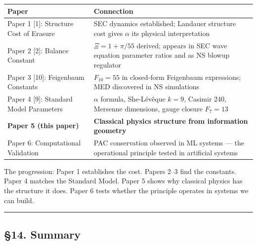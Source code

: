 \documentclass[
  11pt,
  a4paper]{article}
\begin{document}
\begin{longtable}[]{@{}
  >{\raggedright\arraybackslash}p{}
  >{\raggedright\arraybackslash}p{}@{}}
\toprule\noalign{}
\begin{minipage}[b]{\linewidth}\raggedright
Paper
\end{minipage} & \begin{minipage}[b]{\linewidth}\raggedright
Connection
\end{minipage} \\
\midrule\noalign{}
\endhead
\bottomrule\noalign{}
\endlastfoot
Paper 1 {[}1{]}: Structure Cost of Erasure & SEC dynamics established;
Landauer structure cost gives \(\alpha\) its physical interpretation \\
Paper 2 {[}2{]}: Balance Constant & \(\Xi = 1 + \pi/55\) derived;
appears in SEC wave equation parameter ratios and as NS blowup
regulator \\
Paper 3 {[}10{]}: Feigenbaum Constants & \(F_{10} = 55\) in closed-form
Feigenbaum expressions; MED discovered in NS simulations \\
Paper 4 {[}9{]}: Standard Model Parameters & \(\alpha\) formula,
She-Lévêque \(k = 9\), Casimir 240, Mersenne dimensions, gauge closure
\(F_7 = 13\) \\
\textbf{Paper 5 (this paper)} & \textbf{Classical physics structure from
information geometry} \\
Paper 6: Computational Validation & PAC conservation observed in ML
systems --- the operational principle tested in artificial systems \\
\end{longtable}

The progression: Paper 1 establishes the cost. Papers 2--3 find the
constants. Paper 4 matches the Standard Model. Paper 5 shows why
classical physics has the structure it does. Paper 6 tests whether the
principle operates in systems we can build.

\begin{center}\rule{0.5\linewidth}{0.5pt}\end{center}

\subsection{§14. Summary}\label{summary}
\end{document}

